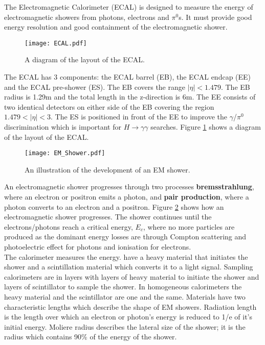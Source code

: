 The Electromagnetic Calorimeter (ECAL) is designed to measure the energy of
electromagnetic showers from photons, electrons and $\pi^{0}$s. It must provide
good energy resolution and good containment of the electromagnetic shower. \\

\begin{figure}
\begin{center}
\texttt{[image: ECAL.pdf]}
\end{center}
\caption{A diagram of the layout of the ECAL.}
\label{fig:ECAL}
\end{figure}

The ECAL has 3 components: the ECAL barrel (EB), the ECAL endcap (EE) and the
ECAL pre-shower (ES). The EB covers the range $|\eta| < 1.479$. The EB radius is
1.29m and the total length in the z-direction is 6m. The EE consists of two 
identical detectors on either side of the EB covering the region $1.479 < |\eta|
< 3$. The ES is positioned in front of the EE to improve the $\gamma$/$\pi^{0}$ 
discrimination which is important for $H\rightarrow\gamma\gamma$ searches. 
Figure \ref{fig:ECAL} shows a diagram of the layout of the ECAL. \\

\begin{figure}
\begin{center}
\texttt{[image: EM\_Shower.pdf]}
\end{center}
\caption{An illustration of the development of an EM shower.}
\label{fig:em_shower}
\end{figure}

An electromagnetic shower progresses through two processes {\bf bremsstrahlung},
where an electron or positron emits a photon, and {\bf pair production}, where a
photon converts to an electron and a positron. Figure \ref{fig:em_shower} shows
how an electromagnetic shower progresses. The shower continues until the
electrons/photons reach a critical energy, $E_{c}$, where no more particles are 
produced as the dominant energy losses are through Compton scattering and
photoelectric effect for photons and ionisation for electrons. \\

The calorimeter measures the energy. have a heavy material that initiates the shower and a scintillation
material which converts it to a light signal. Sampling calorimeters are in
layers with layers of heavy material to initiate the shower and layers of
scintillator to sample the shower. In homogeneous calorimeters the heavy
material and the scintillator are one and the same. Materials have two
characteristic lengths which describe the shape of EM showers. Radiation length
is the length over which an electron or photon's energy is reduced to 1/e of
it's initial energy. Moliere radius describes the lateral size of the shower; it
is the radius which contains 90\% of the energy of the shower. \\  

